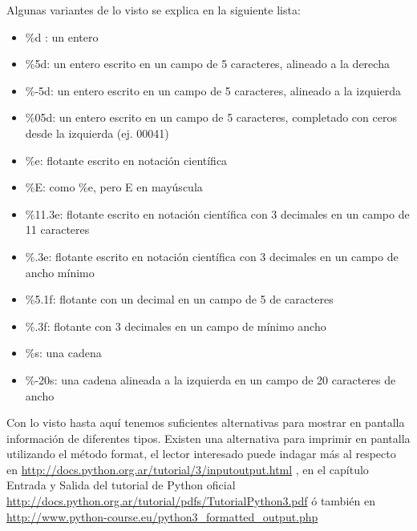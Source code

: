 \documentclass[a4paper,12pt,spanish]{sphinxmanual}
\begin{document}
Algunas variantes de lo visto se explica en la siguiente lista:
\begin{itemize}
\item {} 
\%d : un entero

\item {} 
\%5d: un entero escrito en un campo de 5 caracteres, alineado a la
derecha

\item {} 
\%-5d: un entero escrito en un campo de 5 caracteres, alineado a la
izquierda

\item {} 
\%05d: un entero escrito en un campo de 5 caracteres, completado con
ceros desde la izquierda (ej. 00041)

\item {} 
\%e: flotante escrito en notación científica

\item {} 
\%E: como \%e, pero E en mayúscula

\item {} 
\%11.3e: flotante escrito en notación científica con 3 decimales en un
campo de 11 caracteres

\item {} 
\%.3e: flotante escrito en notación científica con 3 decimales en un
campo de ancho mínimo

\item {} 
\%5.1f: flotante con un decimal en un campo de 5 de caracteres

\item {} 
\%.3f: flotante con 3 decimales en un campo de mínimo ancho

\item {} 
\%s: una cadena

\item {} 
\%-20s: una cadena alineada a la izquierda en un campo de 20
caracteres de ancho

\end{itemize}

Con lo visto hasta aquí tenemos suficientes alternativas para mostrar en
pantalla información de diferentes tipos. Existen una alternativa para
imprimir en pantalla utilizando el método format, el lector interesado
puede indagar más al respecto en
\href{http://docs.python.org.ar/tutorial/3/inputoutput.html}{http://docs.python.org.ar/tutorial/3/inputoutput.html} , en el capítulo
Entrada y Salida del tutorial de Python oficial
\href{http://docs.python.org.ar/tutorial/pdfs/TutorialPython3.pdf}{http://docs.python.org.ar/tutorial/pdfs/TutorialPython3.pdf} ó también en
\href{http://www.python-course.eu/python3\_formatted\_output.php}{http://www.python-course.eu/python3\_formatted\_output.php}
\end{document}
